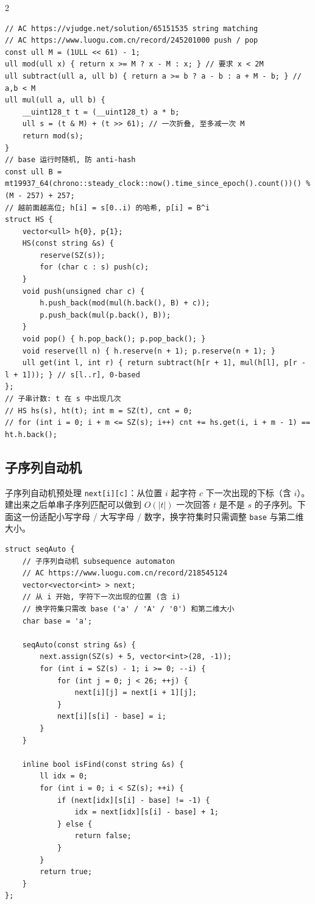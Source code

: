 \begin{multicols*}{2}
		\begin{verbatim}
// AC https://vjudge.net/solution/65151535 string matching
// AC https://www.luogu.com.cn/record/245201000 push / pop
const ull M = (1ULL << 61) - 1;
ull mod(ull x) { return x >= M ? x - M : x; } // 要求 x < 2M
ull subtract(ull a, ull b) { return a >= b ? a - b : a + M - b; } // a,b < M
ull mul(ull a, ull b) {
	__uint128_t t = (__uint128_t) a * b;
	ull s = (t & M) + (t >> 61); // 一次折叠, 至多减一次 M
	return mod(s);
}
// base 运行时随机, 防 anti-hash
const ull B = mt19937_64(chrono::steady_clock::now().time_since_epoch().count())() % (M - 257) + 257;
// 越前面越高位; h[i] = s[0..i) 的哈希, p[i] = B^i
struct HS {
	vector<ull> h{0}, p{1};
	HS(const string &s) {
		reserve(SZ(s));
		for (char c : s) push(c);
	}
	void push(unsigned char c) {
		h.push_back(mod(mul(h.back(), B) + c));
		p.push_back(mul(p.back(), B));
	}
	void pop() { h.pop_back(); p.pop_back(); }
	void reserve(ll n) { h.reserve(n + 1); p.reserve(n + 1); }
	ull get(int l, int r) { return subtract(h[r + 1], mul(h[l], p[r - l + 1])); } // s[l..r], 0-based
};
// 子串计数: t 在 s 中出现几次
// HS hs(s), ht(t); int m = SZ(t), cnt = 0;
// for (int i = 0; i + m <= SZ(s); i++) cnt += hs.get(i, i + m - 1) == ht.h.back();
		\end{verbatim}

		\subsection{子序列自动机}

		子序列自动机预处理 \verb|next[i][c]|：从位置 $i$ 起字符 $c$ 下一次出现的下标（含 $i$）。建出来之后单串子序列匹配可以做到 $O(|t|)$ 一次回答 $t$ 是不是 $s$ 的子序列。下面这一份适配小写字母 / 大写字母 / 数字，换字符集时只需调整 \verb|base| 与第二维大小。

		\begin{verbatim}
struct seqAuto {
	// 子序列自动机 subsequence automaton
	// AC https://www.luogu.com.cn/record/218545124
	vector<vector<int> > next;
	// 从 i 开始, 字符下一次出现的位置 (含 i)
	// 换字符集只需改 base ('a' / 'A' / '0') 和第二维大小
	char base = 'a';

	seqAuto(const string &s) {
		next.assign(SZ(s) + 5, vector<int>(28, -1));
		for (int i = SZ(s) - 1; i >= 0; --i) {
			for (int j = 0; j < 26; ++j) {
				next[i][j] = next[i + 1][j];
			}
			next[i][s[i] - base] = i;
		}
	}

	inline bool isFind(const string &s) {
		ll idx = 0;
		for (int i = 0; i < SZ(s); ++i) {
			if (next[idx][s[i] - base] != -1) {
				idx = next[idx][s[i] - base] + 1;
			} else {
				return false;
			}
		}
		return true;
	}
};
		\end{verbatim}


\end{multicols*}
